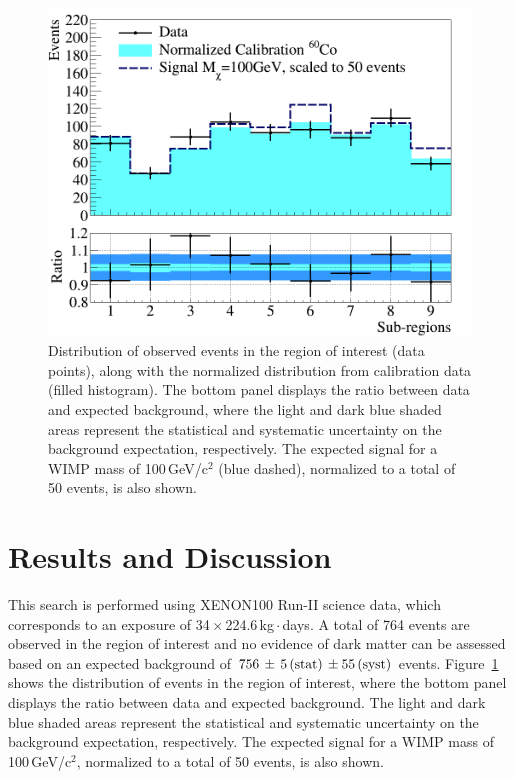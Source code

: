 \begin{figure}[t]
  \includegraphics[width=\linewidth]{data_vs_bkg.png}
  \caption{Distribution of  observed events  in the region of interest (data points), along with the normalized distribution from calibration data (filled histogram). The bottom panel displays the ratio
between data and expected background, where the light  and dark blue shaded areas represent the statistical and systematic uncertainty 
on the background expectation, respectively. The expected signal for a WIMP mass of 100\,GeV/c$^2$ (blue dashed), normalized to a total of 50 events, is also shown.}
  \label{fig:dataVSbkg}
\end{figure}


\section{Results and Discussion}
\label{sec:results}

This search is performed using XENON100 Run-II science data, which corresponds to an exposure of 34\,$\times$\,224.6\,kg\,$\cdot$\,days. 
A total of 764 events are observed in the region of interest and no evidence of dark matter can be assessed based on an expected background of
$756 \, \pm \, 5 \,{\rm (stat)} \, \pm 55\, {\rm (syst)}$ events. 
Figure~\ref{fig:dataVSbkg} shows the distribution of  events  in the region of interest, where the bottom panel displays the ratio
between data and expected background. The light and dark blue shaded areas represent the statistical and systematic uncertainty 
on the background expectation, respectively. The expected signal for a WIMP mass of 100\,GeV/c$^2$, normalized to a total of 50 events, is also shown.



